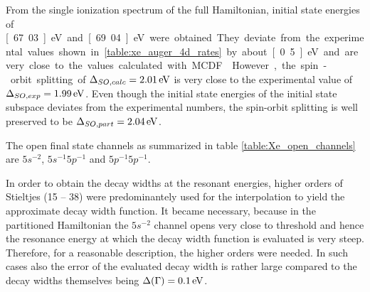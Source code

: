 From the single ionization spectrum of the full Hamiltonian, initial state
energies of \unit[67.03]{eV} and \unit[69.04]{eV} were obtained. They deviate
from the experimental values shown in \ref{table:xe_auger_4d_rates}
by about \unit[0.5]{eV} and are very close to the values calculated with
\ac{MCDF} \cite{Fritzsche11}. However, the spin-orbit splitting of
$\Delta_{SO,calc}=\unit[2.01]{eV}$ is very close to the experimental value
of $\Delta_{SO,exp}=\unit[1.99]{eV}$. Even though the initial state energies of the
initial state subspace deviates from the experimental numbers, the spin-orbit
splitting is well preserved to be $\Delta_{SO,part}=\unit[2.04]{eV}$.

The open final state channels as summarized in table
\ref{table:Xe_open_channels} are $5s^{-2}$, $5s^{-1}5p^{-1}$ and $5p^{-1}5p^{-1}$.


In order to obtain the decay widths at the resonant energies,
higher orders of Stieltjes (15 -- 38) were predominantely
used for the interpolation to yield the approximate decay width function.
It became necessary, because in the partitioned Hamiltonian the $5s^{-2}$ channel
opens very close to threshold and hence the resonance energy at which the decay width
function is evaluated is very steep. Therefore, for a reasonable description,
the higher orders were needed. In such cases also the error of the evaluated decay width 
is rather
large compared to the decay widths themselves being $\Delta(\Gamma)=\unit[0.1]{eV}$.


